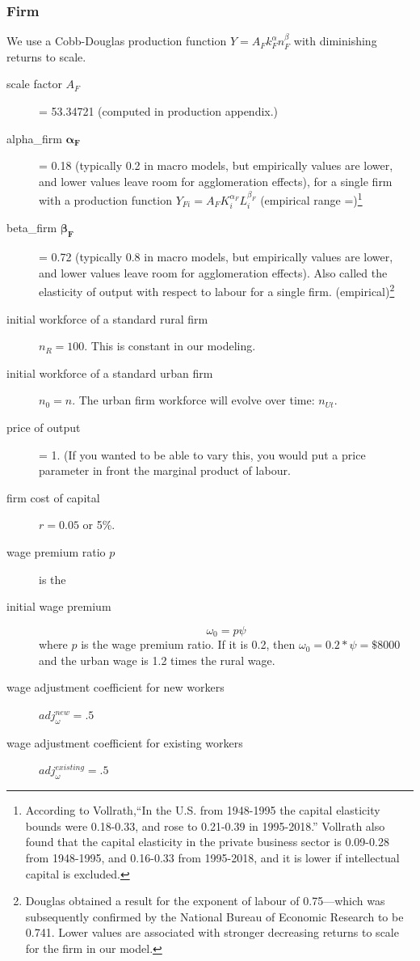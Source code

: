 \subsubsection{Firm}
We use a Cobb-Douglas production function $Y=A_F k_F^\alpha  n_F^\beta$ with diminishing returns to scale. 

\begin{description}

\item [scale factor $A_F$] = 53.34721 (computed in production appendix.)

\item  [alpha\_firm  $\mathbf{\alpha_F}$] = 0.18 (typically 0.2 in macro models, but empirically values are lower, and lower values leave room for agglomeration effects),  for a single firm with a production function $Y_{Fi}=A_F K_i^{\alpha_F }L^{\beta_F}_i$ (empirical range =)\footnote{According to Vollrath,``In the U.S. from 1948-1995 the capital elasticity bounds were 0.18-0.33, and rose to 0.21-0.39 in 1995-2018.''\cite{vollrathElasticityAggregateOutput2021} Vollrath also found that the capital elasticity in the private business sector is 0.09-0.28 from 1948-1995, and 0.16-0.33 from 1995-2018, and it is lower if intellectual capital is excluded.}

\item  [beta\_firm $\mathbf{\beta_F}$] = 0.72 (typically 0.8 in macro models, but empirically values are lower, and lower values leave room for agglomeration effects). Also called the elasticity of output with respect to labour for a single firm. (empirical)\footnote{Douglas  obtained a result for the exponent of labour of 0.75—which was subsequently confirmed by the National Bureau of Economic Research to be 0.741. Lower values  are associated with stronger decreasing returns to scale for the firm in our model.} 
\item [initial workforce of a standard rural firm] $n_R=100$. This is constant in our modeling. 

\item [initial workforce of a standard urban firm] $n_0=n$.  The urban firm workforce will evolve over time: $n_{Ut}$. 

\item [price of output] = 1. (If you wanted to be able to vary this, you would put a price parameter in front the %
\gls{marginal product of labour}. %

\item [firm cost of capital] $r = 0.05$ or 5\%.
\item[wage premium ratio $p$] is the 
\item [initial wage premium]  
\[\omega_0 = p \psi\] 
where $p$ is the wage premium ratio. If it is 0.2, then $\omega_0= 0.2*\psi =\$8000$ and the urban wage is 1.2 times the rural wage.

\item [wage adjustment coefficient for new workers ] $adj^{new}_\omega=.5$

\item [wage adjustment coefficient for existing workers] $adj^{existing}_\omega=.5$
\end{description}
    

